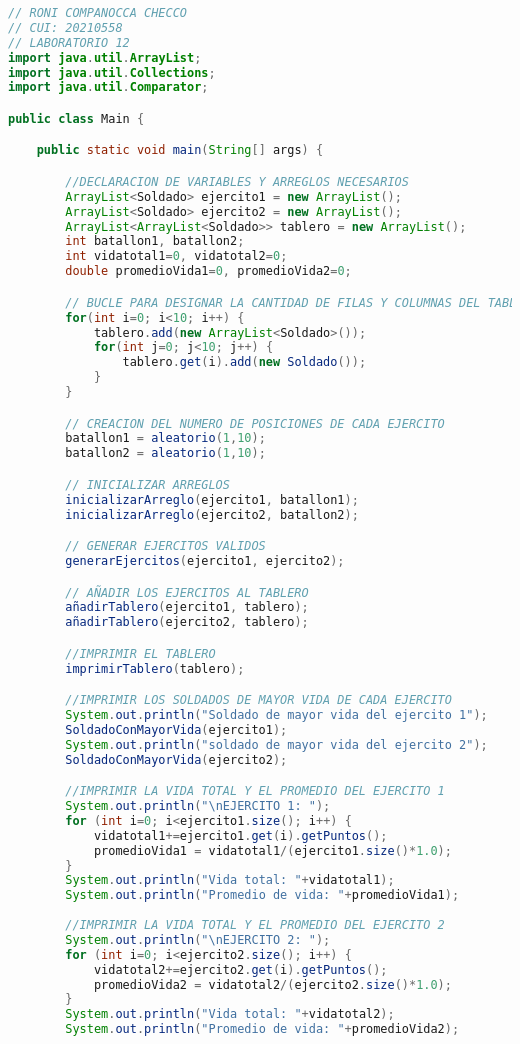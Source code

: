 \documentclass{article}
\begin{document}
\begin{itemize}
\begin{itemize}
        \begin{lstlisting}[language=java]
// RONI COMPANOCCA CHECCO
// CUI: 20210558
// LABORATORIO 12
import java.util.ArrayList;
import java.util.Collections;
import java.util.Comparator;

public class Main {

    public static void main(String[] args) {

		//DECLARACION DE VARIABLES Y ARREGLOS NECESARIOS
		ArrayList<Soldado> ejercito1 = new ArrayList();
		ArrayList<Soldado> ejercito2 = new ArrayList();
		ArrayList<ArrayList<Soldado>> tablero = new ArrayList();
		int batallon1, batallon2;
		int vidatotal1=0, vidatotal2=0;
		double promedioVida1=0, promedioVida2=0;

		// BUCLE PARA DESIGNAR LA CANTIDAD DE FILAS Y COLUMNAS DEL TABLERO
		for(int i=0; i<10; i++) {
			tablero.add(new ArrayList<Soldado>());
			for(int j=0; j<10; j++) {
				tablero.get(i).add(new Soldado());
			}
		}

		// CREACION DEL NUMERO DE POSICIONES DE CADA EJERCITO
		batallon1 = aleatorio(1,10);
		batallon2 = aleatorio(1,10);

		// INICIALIZAR ARREGLOS
		inicializarArreglo(ejercito1, batallon1);
		inicializarArreglo(ejercito2, batallon2);

		// GENERAR EJERCITOS VALIDOS
		generarEjercitos(ejercito1, ejercito2);

		// AÑADIR LOS EJERCITOS AL TABLERO
		añadirTablero(ejercito1, tablero);
		añadirTablero(ejercito2, tablero);

		//IMPRIMIR EL TABLERO
		imprimirTablero(tablero);

		//IMPRIMIR LOS SOLDADOS DE MAYOR VIDA DE CADA EJERCITO
		System.out.println("Soldado de mayor vida del ejercito 1");
		SoldadoConMayorVida(ejercito1);
		System.out.println("soldado de mayor vida del ejercito 2");
		SoldadoConMayorVida(ejercito2);

		//IMPRIMIR LA VIDA TOTAL Y EL PROMEDIO DEL EJERCITO 1
		System.out.println("\nEJERCITO 1: ");
		for (int i=0; i<ejercito1.size(); i++) {
			vidatotal1+=ejercito1.get(i).getPuntos();
			promedioVida1 = vidatotal1/(ejercito1.size()*1.0);
		}
		System.out.println("Vida total: "+vidatotal1);
		System.out.println("Promedio de vida: "+promedioVida1);
		
		//IMPRIMIR LA VIDA TOTAL Y EL PROMEDIO DEL EJERCITO 2
		System.out.println("\nEJERCITO 2: ");
		for (int i=0; i<ejercito2.size(); i++) {
			vidatotal2+=ejercito2.get(i).getPuntos();
			promedioVida2 = vidatotal2/(ejercito2.size()*1.0);
		}
		System.out.println("Vida total: "+vidatotal2);
		System.out.println("Promedio de vida: "+promedioVida2);


\end{lstlisting}
\end{itemize}
\end{itemize}
\end{document}
